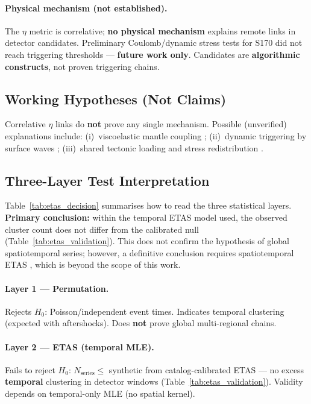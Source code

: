 \documentclass[draft]{agujournal2019}
\begin{document}
\paragraph{Physical mechanism (not established).}
The $\eta$ metric is correlative; \textbf{no physical mechanism} explains
remote links in detector candidates. Preliminary Coulomb/dynamic stress tests
for S170 did not reach triggering thresholds --- \textbf{future work only}.
Candidates are \textbf{algorithmic constructs}, not proven triggering chains.

\subsection{Working Hypotheses (Not Claims)}
\label{subsec:hypotheses}

Correlative $\eta$ links do \textbf{not} prove any single mechanism.
Possible (unverified) explanations include:
(i)~viscoelastic mantle coupling \citep{Pollitz1998};
(ii)~dynamic triggering by surface waves \citep{Hill1993,Brodsky2006};
(iii)~shared tectonic loading and stress redistribution \citep{Freed2001}.

\subsection{Three-Layer Test Interpretation}
\label{sec:dual-etas-interpret}

Table~\ref{tab:etas_decision} summarises how to read the three statistical layers.
\textbf{Primary conclusion:} within the temporal ETAS model used, the observed
cluster count does not differ from the calibrated null (Table~\ref{tab:etas_validation}).
This does not confirm the hypothesis of global spatiotemporal series; however,
a definitive conclusion requires spatiotemporal ETAS \citep{Ogata1998}, which is
beyond the scope of this work.

\paragraph{Layer 1 --- Permutation.}
Rejects $H_0$: Poisson/independent event times. Indicates temporal clustering
(expected with aftershocks). Does \textbf{not} prove global multi-regional chains.

\paragraph{Layer 2 --- ETAS (temporal MLE).}
Fails to reject $H_0$: $N_\mathrm{series} \le$ synthetic from catalog-calibrated
ETAS --- no excess \textbf{temporal}
clustering in detector windows (Table~\ref{tab:etas_validation}).
Validity depends on temporal-only MLE (no spatial kernel).
\end{document}
